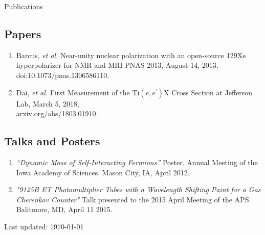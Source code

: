 \documentclass[letterpaper,10pt]{article}
\def\footerlink{}
\renewenvironment{itemize}{
  \begin{list}{}{
    \setlength{\leftmargin}{1.5em}
  }
}{
  \end{list}
}
\begin{document}
{%
{\Large{Publications}}
\subsection*{Papers}
\begin{enumerate}\itemsep1pt \parskip0pt 
\item Barcus, \textit{et al.} Near-unity nuclear polarization with an open-source 129Xe hyperpolarizer for NMR and MRI
PNAS 2013, August 14, 2013, doi:10.1073/pnas.1306586110.

\item Dai, \textit{et al.} First Measurement of the Ti$(e,e^{'})$X Cross Section at Jefferson Lab, March 5, 2018, \\arxiv.org/abs/1803.01910.

\end{enumerate}
\subsection*{Talks and Posters}

\begin{enumerate}\itemsep1pt \parskip0pt 
\item \textit{``Dynamic Mass of Self-Interacting Fermions''} Poster. Annual Meeting of the Iowa Academy of Sciences, Mason City, IA, April 2012.

\item \textit{"9125B ET Photomultiplier Tubes with a Wavelength Shifting Paint for a Gas Cherenkov Counter"} Talk presented to the 2015 April Meeting of the APS. Balitmore, MD, April 11 2015. 

\end{enumerate}

\bigskip
\begin{center}
  \begin{footnotesize}
    Last updated: \today \\
    \href{\footerlink}{\texttt{\footerlink}}
  \end{footnotesize}
\end{center}
}
\end{document}
